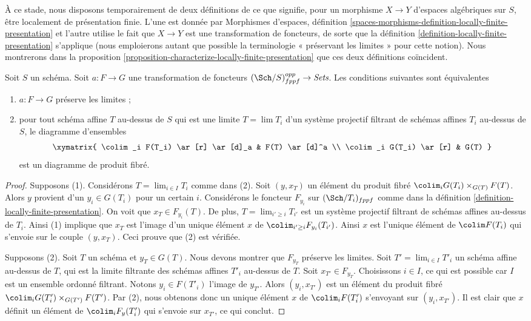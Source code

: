 \medskip\noindent
À ce stade, nous disposons temporairement de deux définitions de ce que signifie,
pour un morphisme $X \to Y$ d'espaces algébriques sur $S$, être localement de présentation
finie. L'une est donnée par
Morphismes d'espaces,
définition \ref{spaces-morphisms-definition-locally-finite-presentation}
et l'autre utilise le fait que $X \to Y$ est une transformation de foncteurs, de sorte que
la définition \ref{definition-locally-finite-presentation}
s'applique (nous emploierons autant que possible la terminologie « préservant les limites »
pour cette notion). Nous montrerons dans
la proposition \ref{proposition-characterize-locally-finite-presentation}
que ces deux définitions coïncident.

\begin{lemma}
\label{lemma-characterize-relative-limit-preserving}
Soit $S$ un schéma. Soit $a : F \to G$ une transformation de foncteurs
$(\Sch/S)_{fppf}^{opp} \to \textit{Sets}$.
Les conditions suivantes sont équivalentes
\begin{enumerate}
\item $a : F \to G$ préserve les limites ;
\item pour tout schéma affine $T$ au-dessus de $S$ qui est une
limite $T = \lim T_i$ d'un système projectif filtrant de
schémas affines $T_i$ au-dessus de $S$, le diagramme d'ensembles
$$
\xymatrix{
\colim_i F(T_i) \ar[r] \ar[d]_a & F(T) \ar[d]^a \\
\colim_i G(T_i) \ar[r] & G(T)
}
$$
est un diagramme de produit fibré.
\end{enumerate}
\end{lemma}

\begin{proof}
Supposons (1). Considérons $T = \lim_{i \in I} T_i$ comme dans (2). Soit
$(y, x_T)$ un élément du produit fibré
$\colim_i G(T_i) \times_{G(T)} F(T)$.
Alors $y$ provient d'un $y_i \in G(T_i)$ pour un certain $i$.
Considérons le foncteur $F_{y_i}$ sur $(\Sch/T_i)_{fppf}$ comme dans
la définition \ref{definition-locally-finite-presentation}.
On voit que $x_T \in F_{y_i}(T)$. De plus, $T = \lim_{i' \geq i} T_{i'}$
est un système projectif filtrant de schémas affines au-dessus de $T_i$. Ainsi (1) implique
que $x_T$ est l'image d'un unique élément $x$ de
$\colim_{i' \geq i} F_{y_i}(T_{i'})$. Ainsi $x$ est l'unique
élément de $\colim F(T_i)$ qui s'envoie sur le couple $(y, x_T)$.
Ceci prouve que (2) est vérifiée.

\medskip\noindent
Supposons (2). Soit $T$ un schéma et $y_T \in G(T)$. Nous devons montrer que
$F_{y_T}$ préserve les limites. Soit $T' = \lim_{i \in I} T'_i$ un
schéma affine au-dessus de $T$, qui est la limite filtrante des schémas affines $T'_i$
au-dessus de $T$. Soit $x_{T'} \in F_{y_T}$. Choisissons $i \in I$, ce qui est possible car
$I$ est un ensemble ordonné filtrant. Notons $y_i \in F(T'_i)$ l'image
de $y_{T'}$. Alors $(y_i, x_{T'})$ est un
élément du produit fibré
$\colim_i G(T'_i) \times_{G(T')} F(T')$.
Par (2), nous obtenons donc un unique élément $x$ de $\colim_i F(T'_i)$
s'envoyant sur $(y_i, x_{T'})$. Il est clair que $x$ définit un élément
de $\colim_i F_y(T'_i)$ qui s'envoie sur $x_{T'}$, ce qui conclut.
\end{proof}

